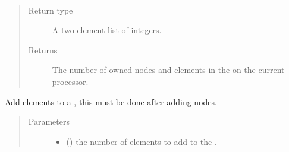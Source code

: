 \documentclass[letterpaper,10pt,english]{sphinxmanual}
\begin{document}
\begin{fulllineitems}
\begin{fulllineitems}
\end{fulllineitems}


\begin{fulllineitems}
\label{\detokenize{mesh:ESMF.api.mesh.Mesh.size_owned}}~\begin{quote}\begin{description}
\item[{Return type}] \leavevmode
A two element list of integers.

\item[{Returns}] \leavevmode
The number of owned nodes and elements in the {\hyperref[\detokenize{mesh:ESMF.api.mesh.Mesh}]{}} on the
current processor.

\end{description}\end{quote}

\end{fulllineitems}


\begin{fulllineitems}
\label{\detokenize{mesh:ESMF.api.mesh.Mesh.add_elements}}
Add elements to a {\hyperref[\detokenize{mesh:ESMF.api.mesh.Mesh}]{}}, this must be done after adding nodes.

\begin{quote}\begin{description}
\item[{Parameters}] \leavevmode\begin{itemize}
\item {} 
 () \textendash{} the number of elements to add to the {\hyperref[\detokenize{mesh:ESMF.api.mesh.Mesh}]{}}.


\end{itemize}
\end{description}
\end{quote}
\end{fulllineitems}
\end{fulllineitems}
\end{document}
